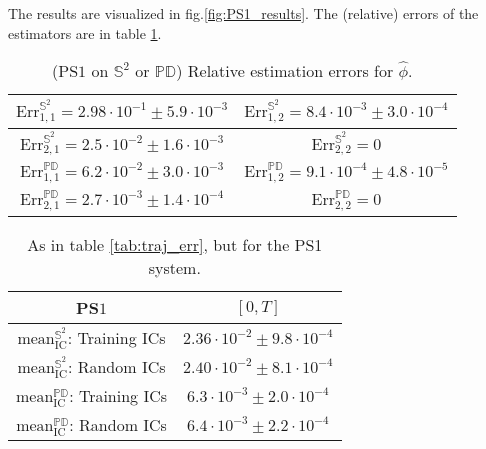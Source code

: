 \documentclass[11pt]{article}
\newcommand{\intkernel}{\phi}
\newcommand{\lintkernel}{\widehat{\intkernel}}
\begin{document}
The results are visualized in fig.\ref{fig:PS1_results}.
The (relative) errors of the estimators are in table \ref{tab:PS1_phiE_errs}.
%
\begin{table}[H]
\centering
\tiny{
\begin{tabular}{ c | c }
\hline
$\text{Err}_{1, 1}^{\mathbb{S}^2}=2.98 \cdot 10^{-1} \pm 5.9 \cdot 10^{-3}$ & $\text{Err}_{1, 2}^{\mathbb{S}^2}=8.4 \cdot 10^{-3} \pm 3.0 \cdot 10^{-4}$ \\
\hline
$\text{Err}_{2, 1}^{\mathbb{S}^2}=2.5 \cdot 10^{-2} \pm 1.6 \cdot 10^{-3}$  & $\text{Err}_{2, 2}^{\mathbb{S}^2}=0$ \\
\hline
\hline
$\text{Err}_{1, 1}^{\mathbb{PD}}=6.2 \cdot 10^{-2} \pm 3.0 \cdot 10^{-3}$  & $\text{Err}_{1, 2}^{\mathbb{PD}}=9.1 \cdot 10^{-4} \pm 4.8 \cdot 10^{-5}$ \\
\hline
$\text{Err}_{2, 1}^{\mathbb{PD}}=2.7 \cdot 10^{-3} \pm 1.4 \cdot 10^{-4}$  & $\text{Err}_{2, 2}^{\mathbb{PD}}=0$ \\
\hline
\end{tabular}  
}
\caption{(PS$1$ on $\mathbb{S}^2$ or $\mathbb{PD}$) Relative estimation errors for $\lintkernel$.}
\label{tab:PS1_phiE_errs} 
\end{table}
%
\begin{table}[H]
\vskip-0.5cm
\centering
\small{\begin{tabular}{| c || c |} 
\hline
        PS$1$                                          & $[0, T]$                                \\
\hline
$\text{mean}_{\text{IC}}^{\mathbb{S}^2}$: Training ICs & $2.36 \cdot 10^{-2} \pm 9.8 \cdot 10^{-4}$ \\
\hline          
$\text{mean}_{\text{IC}}^{\mathbb{S}^2}$: Random ICs   & $2.40 \cdot 10^{-2} \pm 8.1 \cdot 10^{-4}$ \\
\hline
\hline 
$\text{mean}_{\text{IC}}^{\mathbb{PD}}$: Training ICs & $6.3 \cdot 10^{-3} \pm 2.0 \cdot 10^{-4}$ \\
\hline
$\text{mean}_{\text{IC}}^{\mathbb{PD}}$: Random ICs   & $6.4 \cdot 10^{-3} \pm 2.2 \cdot 10^{-4}$ \\
\hline  
\end{tabular}}
\caption{As in table \ref{tab:traj_err}, but for the PS1 system.}
\label{tab:traj_errPS1}
\vskip-0.5cm
\end{table}
%
\end{document}
